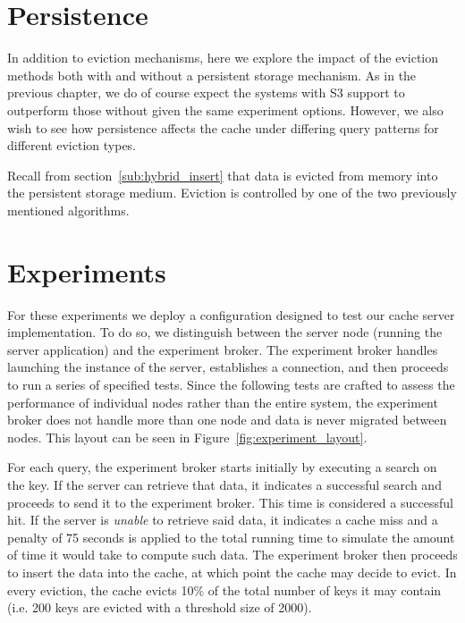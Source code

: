 \section{Persistence} %
\label{sec:persistence}
In addition to eviction mechanisms, here we explore the impact of the eviction
methods both with and without a persistent storage mechanism. As in the
previous chapter, we do of course expect the systems with S3 support to
outperform those without given the same experiment options. However, we also
wish to see how persistence affects the cache under differing query patterns
for different eviction types.

Recall from section~\ref{sub:hybrid_insert} that data is evicted from memory
into the persistent storage medium. Eviction is controlled by one of the two
previously mentioned algorithms.


\section{Experiments} %
\label{sec:experiments_eviction}
For these experiments we deploy a configuration designed to test our cache
server implementation. To do so, we distinguish between the server node
(running the server application) and the experiment broker. The experiment
broker handles launching the instance of the server, establishes a connection,
and then proceeds to run a series of specified tests. Since the following tests
are crafted to assess the performance of individual nodes rather than the
entire system, the experiment broker does not handle more than one node and
data is never migrated between nodes. This layout can be seen in
Figure~\ref{fig:experiment_layout}.

For each query, the experiment broker starts initially by executing a search on
the key. If the server can retrieve that data, it indicates a successful search
and proceeds to send it to the experiment broker. This time is considered a
successful hit. If the server is \emph{unable} to retrieve said data, it
indicates a cache miss and a penalty of 75 seconds is applied to the total
running time to simulate the amount of time it would take to compute such data.
The experiment broker then proceeds to insert the data into the cache, at which
point the cache may decide to evict. In every eviction, the cache evicts 10\% 
of the total number of keys it may contain (i.e. 200 keys are evicted with a
threshold size of 2000).

